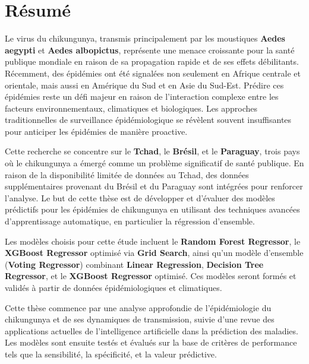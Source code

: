 \chapter*{Résumé}

\renewcommand{\abstractnamefont}{\normalfont\Large\bfseries}

\hskip7mm

\begin{spacing}{1.3}

\end{spacing}

Le virus du chikungunya, transmis principalement par les moustiques \textbf{Aedes aegypti} et \textbf{Aedes albopictus}, représente une menace croissante pour la santé publique mondiale en raison de sa propagation rapide et de ses effets débilitants. Récemment, des épidémies ont été signalées non seulement en Afrique centrale et orientale, mais aussi en Amérique du Sud et en Asie du Sud-Est. Prédire ces épidémies reste un défi majeur en raison de l'interaction complexe entre les facteurs environnementaux, climatiques et biologiques. Les approches traditionnelles de surveillance épidémiologique se révèlent souvent insuffisantes pour anticiper les épidémies de manière proactive.

Cette recherche se concentre sur le \textbf{Tchad}, le \textbf{Brésil}, et le \textbf{Paraguay}, trois pays où le chikungunya a émergé comme un problème significatif de santé publique. En raison de la disponibilité limitée de données au Tchad, des données supplémentaires provenant du Brésil et du Paraguay sont intégrées pour renforcer l'analyse. Le but de cette thèse est de développer et d'évaluer des modèles prédictifs pour les épidémies de chikungunya en utilisant des techniques avancées d'apprentissage automatique, en particulier la régression d'ensemble.

Les modèles choisis pour cette étude incluent le \textbf{Random Forest Regressor}, le \textbf{XGBoost Regressor} optimisé via \textbf{Grid Search}, ainsi qu'un modèle d'ensemble (\textbf{Voting Regressor}) combinant \textbf{Linear Regression}, \textbf{Decision Tree Regressor}, et le \textbf{XGBoost Regressor} optimisé. Ces modèles seront formés et validés à partir de données épidémiologiques et climatiques.

Cette thèse commence par une analyse approfondie de l'épidémiologie du chikungunya et de ses dynamiques de transmission, suivie d'une revue des applications actuelles de l'intelligence artificielle dans la prédiction des maladies. Les modèles sont ensuite testés et évalués sur la base de critères de performance tels que la sensibilité, la spécificité, et la valeur prédictive.

